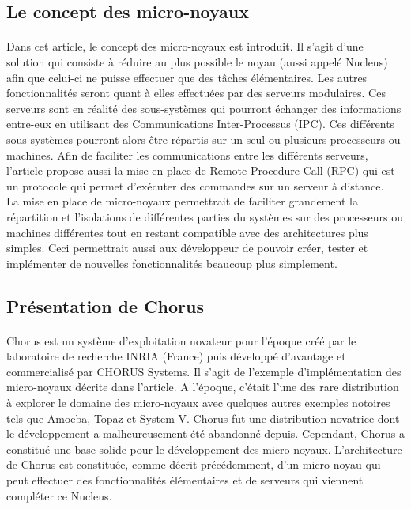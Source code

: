 \documentclass[a4paper, 12pt]{article}
\begin{document}
\subsection{Le concept des micro-noyaux}
\paragraph{}

Dans cet article, le concept des micro-noyaux est introduit. Il s'agit d'une solution qui consiste à réduire au plus possible le noyau (aussi appelé Nucleus) afin que celui-ci ne puisse effectuer que des tâches élémentaires. Les autres fonctionnalités seront quant à elles effectuées par des serveurs modulaires. Ces serveurs sont en réalité des sous-systèmes qui pourront échanger des informations entre-eux en utilisant des Communications Inter-Processus (IPC). Ces différents sous-systèmes pourront alors être répartis sur un seul ou plusieurs processeurs ou machines. Afin de faciliter les communications entre les différents serveurs, l'article propose aussi la mise en place de Remote Procedure Call (RPC) qui est un protocole qui permet d'exécuter des commandes sur un serveur à distance. \\
La mise en place de micro-noyaux permettrait de faciliter grandement la répartition et l'isolations de différentes parties du systèmes sur des processeurs ou machines différentes tout en restant compatible avec des architectures plus simples. Ceci permettrait aussi aux développeur de pouvoir créer, tester et implémenter de nouvelles fonctionnalités beaucoup plus simplement.

\subsection{Présentation de Chorus}
\paragraph{}
Chorus est un système d'exploitation novateur pour l'époque créé par le laboratoire de recherche INRIA (France) puis développé d'avantage et commercialisé par CHORUS Systems. Il s'agit de l'exemple d'implémentation des micro-noyaux décrite dans l'article. A l'époque, c'était l'une des rare distribution à explorer le domaine des micro-noyaux avec quelques autres exemples notoires tels que Amoeba, Topaz et System-V. Chorus fut une distribution novatrice dont le développement a malheureusement été abandonné depuis. Cependant, Chorus a constitué une base solide pour le développement des micro-noyaux. L'architecture de Chorus est constituée, comme décrit précédemment, d'un micro-noyau qui peut effectuer des fonctionnalités élémentaires et de serveurs qui viennent compléter ce Nucleus.
\\
\end{document}
